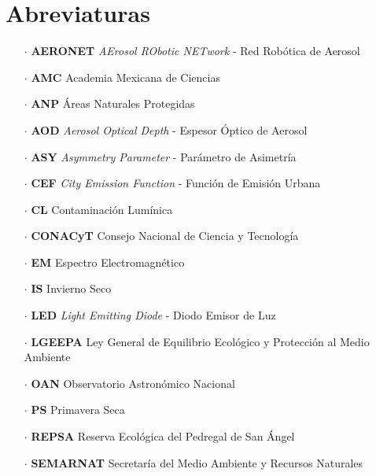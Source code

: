 \chapter{Abreviaturas}

\begin{itemize}

\item[$\cdot$] \textbf{AERONET} \textit{AErosol RObotic NETwork} - Red Robótica de Aerosol

\item[$\cdot$] \textbf{AMC} Academia Mexicana de Ciencias

\item[$\cdot$] \textbf{ANP} Áreas Naturales Protegidas

\item[$\cdot$] \textbf{AOD} \textit{Aerosol Optical Depth} - Espesor Óptico de Aerosol

\item[$\cdot$] \textbf{ASY} \textit{Asymmetry Parameter} - Parámetro de Asimetría

\item[$\cdot$] \textbf{CEF} \textit{City Emission Function} - Función de Emisión Urbana

\item[$\cdot$] \textbf{CL} Contaminación Lumínica

\item[$\cdot$] \textbf{CONACyT} Consejo Nacional de Ciencia y Tecnología

\item[$\cdot$] \textbf{EM} Espectro Electromagnético

\item[$\cdot$] \textbf{IS} Invierno Seco

\item[$\cdot$] \textbf{LED} \textit{Light Emitting Diode} - Diodo Emisor de Luz

\item[$\cdot$] \textbf{LGEEPA} Ley General de Equilibrio Ecológico y Protección al Medio Ambiente

\item[$\cdot$] \textbf{OAN} Observatorio Astronómico Nacional

\item[$\cdot$] \textbf{PS} Primavera Seca

\item[$\cdot$] \textbf{REPSA} Reserva Ecológica del Pedregal de San Ángel

\item[$\cdot$] \textbf{SEMARNAT} Secretaría del Medio Ambiente y Recursos Naturales


\end{itemize}
